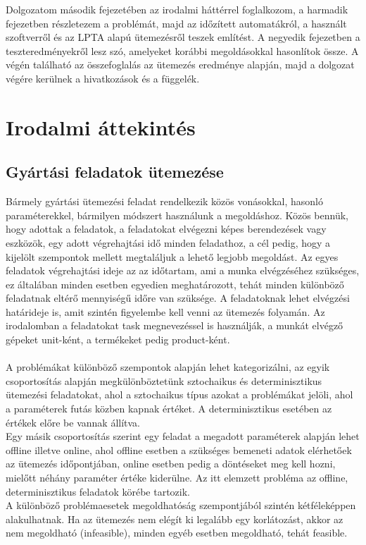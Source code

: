 \documentclass [12pt]{report}
\begin{document}
Dolgozatom második fejezetében az irodalmi háttérrel foglalkozom, a harmadik fejezetben részletezem a problémát, majd az időzített automatákról, a használt szoftverről és az LPTA alapú ütemezésről teszek említést. A negyedik fejezetben a teszteredményekről lesz szó, amelyeket korábbi megoldásokkal hasonlítok össze. A végén található az összefoglalás az ütemezés eredménye alapján, majd a dolgozat végére kerülnek a hivatkozások és a függelék. 


\chapter{Irodalmi áttekintés}
\section{Gyártási feladatok ütemezése}
Bármely gyártási ütemezési feladat rendelkezik közös vonásokkal, hasonló paraméterekkel, bármilyen módszert használunk a megoldáshoz. Közös bennük, hogy adottak a feladatok, a feladatokat elvégezni képes berendezések vagy eszközök, egy adott végrehajtási idő minden feladathoz, a cél pedig, hogy a kijelölt szempontok mellett megtaláljuk a lehető legjobb megoldást. Az egyes feladatok  végrehajtási ideje az az  időtartam, ami a munka elvégzéséhez szükséges, ez általában minden esetben egyedien meghatározott, tehát minden különböző feladatnak eltérő mennyiségű időre van szüksége. A feladatoknak lehet elvégzési határideje is, amit szintén figyelembe kell venni az ütemezés folyamán. Az irodalomban a feladatokat task megnevezéssel is használják, a munkát elvégző gépeket unit-ként, a termékeket pedig product-ként. \\\\
A problémákat különböző szempontok alapján lehet kategorizálni, az egyik csoportosítás alapján megkülönböztetünk sztochaikus és determinisztikus ütemezési feladatokat, ahol a sztochaikus típus azokat a problémákat jelöli, ahol a paraméterek futás közben kapnak értéket. A determinisztikus esetében az értékek előre be vannak állítva. \\
Egy másik csoportosítás szerint egy feladat a megadott paraméterek alapján lehet offline illetve online, ahol offline esetben a szükséges bemeneti adatok elérhetőek az ütemezés időpontjában, online esetben pedig a döntéseket meg kell hozni, mielőtt néhány paraméter értéke kiderülne. Az itt elemzett probléma az offline, determinisztikus feladatok körébe tartozik.\\
A különböző problémaesetek megoldhatóság szempontjából szintén kétféleképpen alakulhatnak. Ha az ütemezés nem elégít ki legalább egy korlátozást, akkor az nem megoldható (infeasible), minden egyéb esetben megoldható, tehát feasible. \\\\
\end{document}
